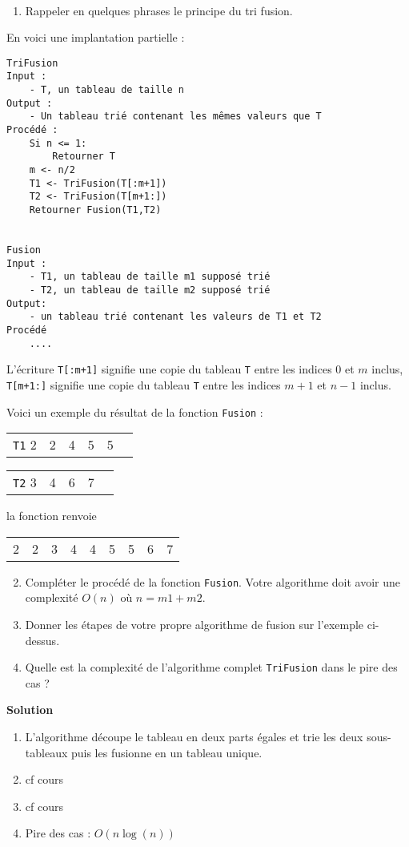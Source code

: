 
\begin{exercice}

~
\begin{enumerate}
\item Rappeler en quelques phrases le principe du tri fusion.
\end{enumerate}

En voici une implantation partielle :

\begin{lstlisting}
TriFusion
Input :
    - T, un tableau de taille n 
Output :
    - Un tableau trié contenant les mêmes valeurs que T 
Procédé :
    Si n <= 1:
        Retourner T
    m <- n/2
    T1 <- TriFusion(T[:m+1])
    T2 <- TriFusion(T[m+1:])
    Retourner Fusion(T1,T2)
    
    
Fusion
Input :
    - T1, un tableau de taille m1 supposé trié
    - T2, un tableau de taille m2 supposé trié
Output:
    - un tableau trié contenant les valeurs de T1 et T2
Procédé
    ....
\end{lstlisting}

L'écriture {\tt T[:m+1]} signifie une copie du tableau {\tt T} entre les indices 0 et $m$ inclus, {\tt T[m+1:]} signifie une copie du tableau {\tt T} entre les indices $m+1$ et $n-1$ inclus.

Voici un exemple du résultat de la fonction {\tt Fusion} :


\begin{tabular}{cccccc}
{\tt T1} 2 & 2 & 4 & 5 & 5
\end{tabular}

\begin{tabular}{ccccc}
{\tt T2} 3 & 4 & 6 & 7
\end{tabular}

la fonction renvoie

\begin{tabular}{ccccccccc}
2 & 2 & 3 & 4 & 4 & 5 & 5 & 6 & 7
\end{tabular}

\begin{enumerate}
\setcounter{enumi}{1}

\item Compléter le procédé de la fonction {\tt Fusion}. Votre algorithme doit avoir une complexité $O(n)$ où $n = m1 + m2$.

\item Donner les étapes de votre propre algorithme de fusion sur l'exemple ci-dessus.

\item Quelle est la complexité de l'algorithme complet {\tt TriFusion} dans le pire des cas ?
\end{enumerate}

\textbf{Solution}

\begin{enumerate}
\item L'algorithme découpe le tableau en deux parts égales et trie les deux sous-tableaux puis les fusionne en un tableau unique.
\item cf cours
\item cf cours
\item Pire des cas : $O(n \log(n))$
\end{enumerate}

\end{exercice}